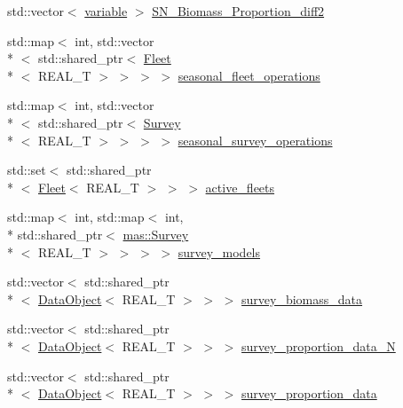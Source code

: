 \begin{DoxyCompactItemize}
\item 
std\-::vector$<$ \hyperlink{structmas_1_1_area_a3fb53ebc27c5323de15a81fbfbc7c878}{variable} $>$ \hyperlink{structmas_1_1_area_a0fb7cac6b986e07c833a1b55b48b8327}{S\-N\-\_\-\-Biomass\-\_\-\-Proportion\-\_\-diff2}
\item 
std\-::map$<$ int, std\-::vector\\*
$<$ std\-::shared\-\_\-ptr$<$ \hyperlink{structmas_1_1_fleet}{Fleet}\\*
$<$ R\-E\-A\-L\-\_\-\-T $>$ $>$ $>$ $>$ \hyperlink{structmas_1_1_area_ac0d892bff62ae6d168ae9161f5db7cf2}{seasonal\-\_\-fleet\-\_\-operations}
\item 
std\-::map$<$ int, std\-::vector\\*
$<$ std\-::shared\-\_\-ptr$<$ \hyperlink{structmas_1_1_survey}{Survey}\\*
$<$ R\-E\-A\-L\-\_\-\-T $>$ $>$ $>$ $>$ \hyperlink{structmas_1_1_area_a513c4bf4e2a1fdd3c63f1bac10e25bc5}{seasonal\-\_\-survey\-\_\-operations}
\item 
std\-::set$<$ std\-::shared\-\_\-ptr\\*
$<$ \hyperlink{structmas_1_1_fleet}{Fleet}$<$ R\-E\-A\-L\-\_\-\-T $>$ $>$ $>$ \hyperlink{structmas_1_1_area_a94bbe58cca17c234df40191bebfef069}{active\-\_\-fleets}
\item 
std\-::map$<$ int, std\-::map$<$ int, \\*
std\-::shared\-\_\-ptr$<$ \hyperlink{structmas_1_1_survey}{mas\-::\-Survey}\\*
$<$ R\-E\-A\-L\-\_\-\-T $>$ $>$ $>$ $>$ \hyperlink{structmas_1_1_area_a06176622d9d6d00ac6725d3f585dad6f}{survey\-\_\-models}
\item 
std\-::vector$<$ std\-::shared\-\_\-ptr\\*
$<$ \hyperlink{structmas_1_1_data_object}{Data\-Object}$<$ R\-E\-A\-L\-\_\-\-T $>$ $>$ $>$ \hyperlink{structmas_1_1_area_a742a11ec29fd3c8cbba9c4fc2ffb650b}{survey\-\_\-biomass\-\_\-data}
\item 
std\-::vector$<$ std\-::shared\-\_\-ptr\\*
$<$ \hyperlink{structmas_1_1_data_object}{Data\-Object}$<$ R\-E\-A\-L\-\_\-\-T $>$ $>$ $>$ \hyperlink{structmas_1_1_area_a1a00923508e1f489be3f5885c9208a75}{survey\-\_\-proportion\-\_\-data\-\_\-\-N}
\item 
std\-::vector$<$ std\-::shared\-\_\-ptr\\*
$<$ \hyperlink{structmas_1_1_data_object}{Data\-Object}$<$ R\-E\-A\-L\-\_\-\-T $>$ $>$ $>$ \hyperlink{structmas_1_1_area_adfe5f97ac7d375c9045b3a17a3c9ccf6}{survey\-\_\-proportion\-\_\-data}

\end{DoxyCompactItemize}
